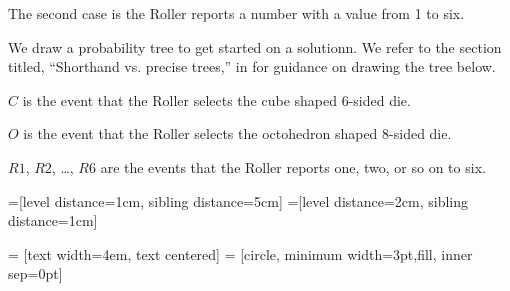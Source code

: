 \documentclass[a4paper,11pt]{article}
\begin{document}
The second case is the Roller reports a number with a value from
1 to six.

We draw a probability tree to get started on a solutionn.  We refer
to the section titled, ``Shorthand vs. precise trees,'' in \cite{reading3}
for guidance on drawing the tree below.

$C$ is the event that the Roller selects the cube shaped $6$-sided die.

$O$ is the event that the Roller selects the octohedron shaped $8$-sided
die.

$R1$, $R2$, \ldots, $R6$ are the events that the Roller reports one, 
two, or so on to six.  

=[level distance=1cm, sibling distance=5cm]
=[level distance=2cm, sibling distance=1cm]

 = [text width=4em, text centered]
 = [circle, minimum width=3pt,fill, inner sep=0pt]

\begin{center}
\end{center}
\end{document}
